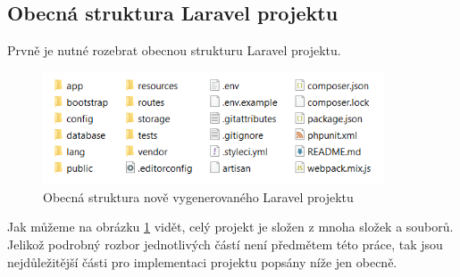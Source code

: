 	\subsection{Obecná struktura Laravel projektu}\label{sec:strukura_laravel}
	Prvně je nutné rozebrat obecnou strukturu Laravel projektu. 
		\begin{figure}[H]
			\centering %
			\includegraphics[width=0.9\textwidth]{img/laravel_struktura.png} %
			\caption{Obecná struktura nově vygenerovaného Laravel projektu} %
			\label{fig:laravel_str} %
		\end{figure}
	Jak můžeme na obrázku \ref{fig:laravel_str} vidět, celý projekt je složen z mnoha složek a souborů. Jelikož podrobný rozbor jednotlivých částí není předmětem této práce, tak jsou nejdůležitější části pro implementaci projektu popsány níže jen obecně.
